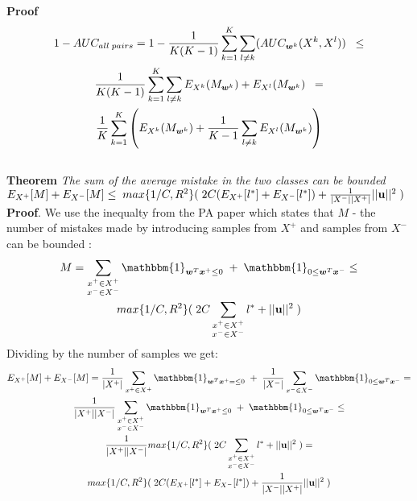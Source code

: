 {\bf Proof} 
\begin{multline}
1 - AUC_{all \; pairs}  = 1 - \frac{1}{K(K-1)} \sum\limits_{k=1}^{K}  \sum\limits_{l \neq k} (AUC_{\bm{w}^k}(X^k, X^l)) \;\;\leq \\
\frac{1}{K(K-1)} \sum\limits_{k=1}^{K}  \sum\limits_{l \neq k} E_{X^k}(M_{\bm{w}^k}) + E_{X^l}(M_{\bm{w}^k}) \;\; = \\
\frac{1}{K} \sum\limits_{k=1}^{K}  \left( E_{X^k}(M_{\bm{w}^k}) +  \frac{1}{K-1} \sum\limits_{l \neq k} E_{X^l}(M_{\bm{w}^k}  ) \right)
\end{multline}
\hfill\BlackBox
\\

{\bf Theorem} {\it The sum of the average mistake in the two classes can be bounded \\
$E_{X^+}[M] + E_{X^-}[M] \leq \; max\{1/C, R^2\}( \; 2C (E_{X^+}[l^{*}] + E_{X^-}[l^{*}]) +
\frac{1}{|X^-| |X^+|}  ||{\bf u}||^2  \;) $
} 
\\


{\bf Proof}.
We use the inequalty from the PA paper which states that $M$ - the number of mistakes made by introducing samples from $X^+$ and samples from $X^-$ can be bounded : \\
\begin{multline}
 M= \sum\limits_{ \substack{x^+ \in X^+ \\ x^- \in X^-}} {  \mathbbm{1}_{\vw^T \vxp \leq 0} \;+\; \mathbbm{1}_{0 \leq \vw^T \vxn}  } \leq \\
 max\{1/C, R^2\}( \; 2C \sum\limits_{ \substack{x^+ \in X^+ \\ x^- \in X^-}}l^{*} +
 ||{\bf u}||^2  \;) 
\end{multline}
Dividing by the number of samples we get:
\begin{multline}
 E_{X^+}[M] + E_{X^-}[M] = 
 \frac{1}{|X^+|} \sum\limits_{ x^+ \in X^+ }   \mathbbm{1}_{\vw^T \vxp = \leq 0} \;+\; 
 \frac{1}{|X^-|} \sum\limits_{ x^- \in X^- } \mathbbm{1}_{0 \leq \vw^T \vxn} = \\
 \frac{1}{|X^+| |X^-|} \sum\limits_{ \substack{x^+ \in X^+ \\ x^- \in X^-}} {  \mathbbm{1}_{\vw^T \vxp \leq 0} \;+\; \mathbbm{1}_{0 \leq \vw^T \vxn}  }    \leq \\
 \frac{1}{|X^+| |X^-|} max\{1/C, R^2\}( \; 2C \sum\limits_{ \substack{x^+ \in X^+ \\ x^- \in X^-}}l^{*} +
 ||{\bf u}||^2  \;) = \\
 max\{1/C, R^2\}( \; 2C (E_{X^+}[l^{*}] + E_{X^-}[l^{*}]) +
\frac{1}{|X^-| |X^+|}  ||{\bf u}||^2  \;) 
\end{multline}
\hfill\BlackBox


